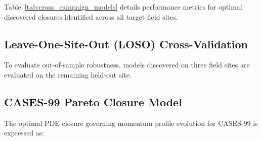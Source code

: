 \documentclass[11pt,a4paper]{article}
\begin{document}
Table~\ref{tab:cross_campaign_models} details performance metrics for optimal discovered closures identified across all target field sites.

\begin{table}[H]
    \centering
    \caption{Cross-campaign Pareto-optimal discovered model performance metrics.}
    \label{tab:cross_campaign_models}
    
\end{table}

\begin{table}[H]
    \centering
    \small
    \caption{Selected cross-campaign benchmark results generated from the validated JSON and CSV artifacts. Observation basis records how each campaign is mapped into modal space.}
    \label{tab:cross_campaign_results}
    \resizebox{\linewidth}{!}{}
\end{table}

\subsection{Leave-One-Site-Out (LOSO) Cross-Validation}

To evaluate out-of-sample robustness, models discovered on three field sites are evaluated on the remaining held-out site.

\begin{table}[H]
    \centering
    \caption{LOSO cross-validation out-of-sample metrics by held-out campaign site.}
    \label{tab:loso_summary}
    
\end{table}

\subsection{CASES-99 Pareto Closure Model}

The optimal PDE closure governing momentum profile evolution for CASES-99 is expressed as:



\begin{table}[H]
    \centering
    \caption{Discovered library terms and estimated sparse coefficients for CASES-99.}
    \label{tab:cases99_terms}
    
\end{table}
\end{document}
